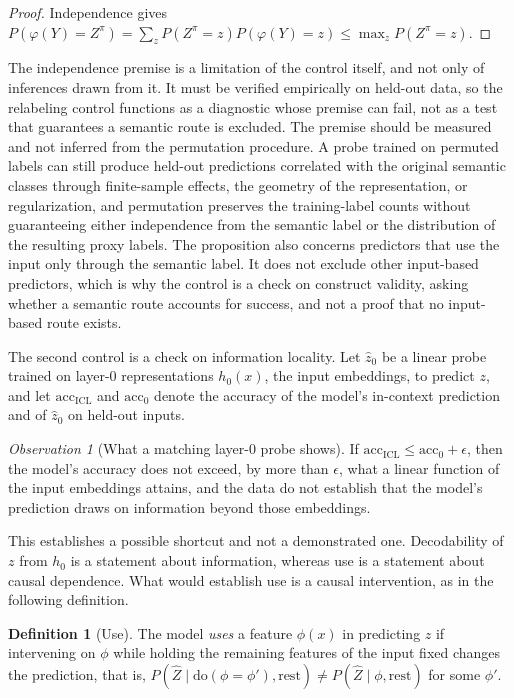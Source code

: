 \documentclass[11pt]{article}
\theoremstyle{definition}
\newtheorem{definition}{Definition}
\theoremstyle{remark}
\newtheorem{observation}{Observation}
\begin{document}
\begin{proof}
Independence gives $P(\varphi(Y)=Z^\pi)=\sum_z P(Z^\pi=z)P(\varphi(Y)=z)\le\max_z P(Z^\pi=z)$.
\end{proof}

The independence premise is a limitation of the control itself, and not only of inferences drawn from it. It must be verified empirically on held-out data, so the relabeling control functions as a diagnostic whose premise can fail, not as a test that guarantees a semantic route is excluded. The premise should be measured and not inferred from the permutation procedure. A probe trained on permuted labels can still produce held-out predictions correlated with the original semantic classes through finite-sample effects, the geometry of the representation, or regularization, and permutation preserves the training-label counts without guaranteeing either independence from the semantic label or the distribution of the resulting proxy labels. The proposition also concerns predictors that use the input only through the semantic label. It does not exclude other input-based predictors, which is why the control is a check on construct validity, asking whether a semantic route accounts for success, and not a proof that no input-based route exists.

The second control is a check on information locality. Let $\hat z_0$ be a linear probe trained on layer-0 representations $h_0(x)$, the input embeddings, to predict $z$, and let $\mathrm{acc}_{\mathrm{ICL}}$ and $\mathrm{acc}_0$ denote the accuracy of the model's in-context prediction and of $\hat z_0$ on held-out inputs.

\begin{observation}[What a matching layer-0 probe shows]\label{prop:layer0}
If $\mathrm{acc}_{\mathrm{ICL}}\le\mathrm{acc}_0+\epsilon$, then the model's accuracy does not exceed, by more than $\epsilon$, what a linear function of the input embeddings attains, and the data do not establish that the model's prediction draws on information beyond those embeddings.
\end{observation}

This establishes a possible shortcut and not a demonstrated one. Decodability of $z$ from $h_0$ is a statement about information, whereas use is a statement about causal dependence. What would establish use is a causal intervention, as in the following definition.

\begin{definition}[Use]
The model \emph{uses} a feature $\phi(x)$ in predicting $z$ if intervening on $\phi$ while holding the remaining features of the input fixed changes the prediction, that is, $P(\hat Z\mid\mathrm{do}(\phi=\phi'),\text{rest})\neq P(\hat Z\mid\phi,\text{rest})$ for some $\phi'$.
\end{definition}
\end{document}
